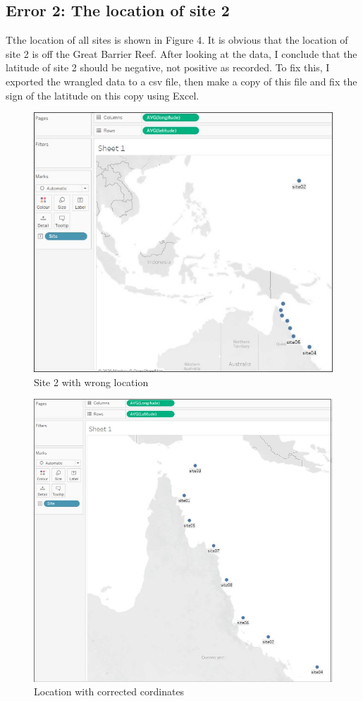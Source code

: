 \documentclass[a4paper,12pt,twoside]{article}
\begin{document}
\subsection*{Error 2: The location of site 2}
Tthe location of all sites is shown in Figure 4. It is obvious that the location of site 2 is off the Great Barrier Reef. After looking at the data, I conclude that the latitude of site 2 should be negative, not positive as recorded. To fix this, I exported the wrangled data to a csv file, then make a copy of this file and fix the sign of the latitude on this copy using Excel.
\begin{figure}[h]
\caption{Site 2 with wrong location}
\includegraphics[scale=0.5]{img/e1.jpg}
\centering
\end{figure}

\begin{figure}[h]
\caption{Location with corrected cordinates}
\includegraphics[scale=0.35]{img/e11.jpg}
\centering
\end{figure}
\end{document}
